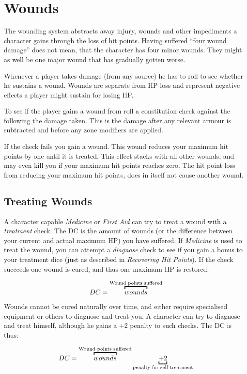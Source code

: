 \section{Wounds}
\label{sub:Wounds}

The wounding system abstracts away injury, wounds and other impediments a
character gains through the loss of hit points. Having suffered ``four wound
damage'' does not mean, that the character has four minor wounds. They might as
well be one major wound that has gradually gotten worse.

Whenever a player takes damage (from any source) he has to roll to see whether
he sustains a wound. Wounds are separate from HP loss and represent negative
effects a player might sustain for losing HP.

To see if the player gains a wound from roll a constitution check against the
following the damage taken. This is the damage after any relevant armour is
subtracted and before any zone modifiers are applied.

If the check fails you gain a wound. This wound reduces your maximum hit points
by one until it is treated. This effect stacks with all other wounds, and may
even kill you if your maximum hit points reaches zero. The hit point loss from
reducing your maximum hit points, does in itself not cause another wound.

\subsection{Treating Wounds}

A character capable \emph{Medicine} or \emph{First Aid} can try to treat a
wound with a \emph{treatment} check. The DC is the amount of wounds (or the
difference between your current and actual maximum HP) you have suffered. If
\emph{Medicine} is used to treat the wound, you can attempt a \emph{diagnose}
check to see if you gain a bonus to your treatment dice (just as described in
\emph{Recovering Hit Points}). If the check succeeds one wound is cured, and
thus one maximum HP is restored.

\[
DC = \ob{wounds}{Wound points suffered}
\]

Wounds cannot be cured naturally over time, and either require specialised
equipment or others to diagnose and treat you. A character can try to diagnose
and treat himself, although he gains a +2 penalty to such checks. The DC is
thus:

\[
DC = \ob{wounds}{Wound points suffered} \ub{+ 2}{penalty for self treatment}
\]

